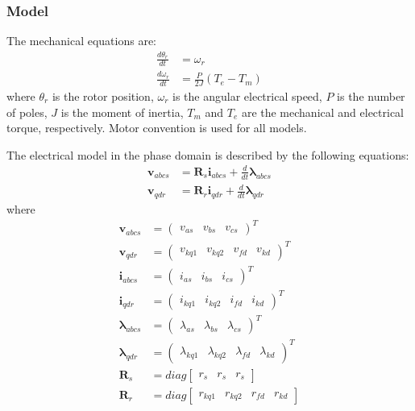 \subsubsection{Model}

The mechanical equations are:
%
\begin{align}
\frac{d\theta_r}{dt} &= \omega_r \label{eq:d_theta} \\
\frac{d\omega_r}{dt} &= \frac{P}{2J} (T_e-T_m) \label{eq:d_omega}
\end{align}
%
where $\theta_r$ is the rotor position, $\omega_r$ is the angular electrical speed, $P$ is the number of poles, $J$ is the moment of inertia, $T_m$ and $T_e$ are the mechanical and electrical torque, respectively. Motor convention is used for all models. 

The electrical model in the phase domain is described by the following equations:
%
\begin{align}
  \mathbf{v}_{abcs} &= \mathbf{R}_s \mathbf{i}_{abcs} + \frac{d}{dt} \boldsymbol{\lambda}_{abcs} \\
  \mathbf{v}_{qdr} &= \mathbf{R}_r \mathbf{i}_{qdr} + \frac{d}{dt}  \boldsymbol{\lambda}_{qdr}
\end{align}
%
where
%
\begin{align}
  \mathbf{v}_{abcs} &= 
  \begin{pmatrix}
    v_{as} & v_{bs} & v_{cs}
  \end{pmatrix}^T \\
  \mathbf{v}_{qdr} &= 
  \begin{pmatrix}
    v_{kq1} & v_{kq2} & v_{fd} & v_{kd} 
  \end{pmatrix}^T \\
  \mathbf{i}_{abcs} &= 
  \begin{pmatrix}
    i_{as} & i_{bs} & i_{cs}
  \end{pmatrix}^T \\
  \mathbf{i}_{qdr} &= 
  \begin{pmatrix}
    i_{kq1} & i_{kq2} & i_{fd} & i_{kd} 
  \end{pmatrix}^T \\
  \boldsymbol{\lambda}_{abcs} &= 
  \begin{pmatrix}
    \lambda_{as} & \lambda_{bs} & \lambda_{cs}
  \end{pmatrix}^T \\
  \boldsymbol{\lambda}_{qdr} &= 
  \begin{pmatrix}
    \lambda_{kq1} & \lambda_{kq2} & \lambda_{fd} & \lambda_{kd} 
  \end{pmatrix}^T \\
  \mathbf{R}_s &= diag
  \begin{bmatrix}
    r_s & r_s & r_s 
  \end{bmatrix} \\
  \mathbf{R}_r &= diag
  \begin{bmatrix}
    r_{kq1} & r_{kq2} & r_{fd} & r_{kd}
  \end{bmatrix}
\end{align}
